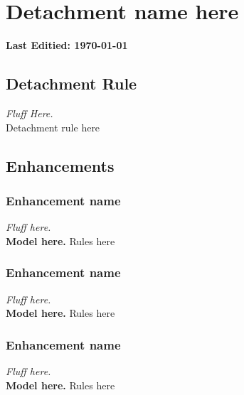 \documentclass{report}
\begin{document}
\color[HTML]{FFFFFF}\chapter{Detachment name here}
\textbf{Last Editied: \today}
\begin{multicols}{2}
\color[HTML]{000000}\section{Detachment Rule}\label{sec:rule}%
\textit{Fluff Here.}\\
Detachment rule here
\vfill\null
\columnbreak

\color[HTML]{000000}\section{Enhancements}
\vspace{1mm}
\subsection{Enhancement name}
\vspace{1mm}
\textit{Fluff here.}\\
\textbf{Model here.} Rules here\\
\subsection{Enhancement name}
\vspace{1mm}
\textit{Fluff here.}\\
\textbf{Model here.} Rules here\\
\subsection{Enhancement name}
\vspace{1mm}
\textit{Fluff here.}\\
\textbf{Model here.} Rules here\\

\end{multicols}
\end{document}
